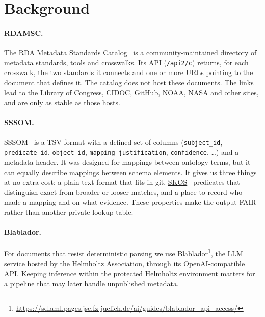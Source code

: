 \documentclass[10pt,twocolumn,a4paper]{extarticle}
\begin{document}
\section{Background}\label{sec:background}

\paragraph{RDAMSC.} The RDA Metadata Standards Catalog~\cite{rdamsc} is a
community-maintained directory of metadata standards, tools and
crosswalks. Its API (\href{https://app.swaggerhub.com/apis-docs/alex-ball/rda-metadata-standards-catalog/2.1.0#/c/get_api2_c}{\texttt{/api2/c}}) returns, for each crosswalk, the
two standards it connects and one or more URLs pointing to the document
that defines it. The catalog does not host these documents. The links lead to the
\href{https://www.loc.gov/standards/}{Library of Congress},
\href{https://cidoc-crm.org/}{CIDOC},
\href{https://github.com}{GitHub},
\href{https://www.noaa.gov}{NOAA},
\href{https://www.nasa.gov}{NASA} and other sites, and
are only as stable as those hosts.

\paragraph{SSSOM.} SSSOM~\cite{matentzoglu2022sssom} is a TSV format with a defined set of columns
(\texttt{subject\_id}, \texttt{predicate\_id}, \texttt{object\_id},
\texttt{mapping\_justification}, \texttt{confidence}, \ldots) and a
metadata header. It was designed for mappings between ontology terms, but it
can equally describe mappings between schema elements. It gives us three
things at no extra cost: a plain-text format that fits in git, \href{https://www.w3.org/TR/skos-reference/}{SKOS}~\cite{miles2009skos} predicates that
distinguish exact from broader or looser matches, and a place to record
who made a mapping and on what evidence. These properties make the output
FAIR~\cite{fair2016} rather than another private lookup table.

\paragraph{Blablador.} For documents that resist deterministic parsing we
use Blablador\footnote{\url{https://sdlaml.pages.jsc.fz-juelich.de/ai/guides/blablador_api_access/}}, the LLM service hosted by the Helmholtz Association, through
its OpenAI-compatible API. Keeping inference within the protected Helmholtz environment
matters for a pipeline that may later handle unpublished metadata.
\end{document}
